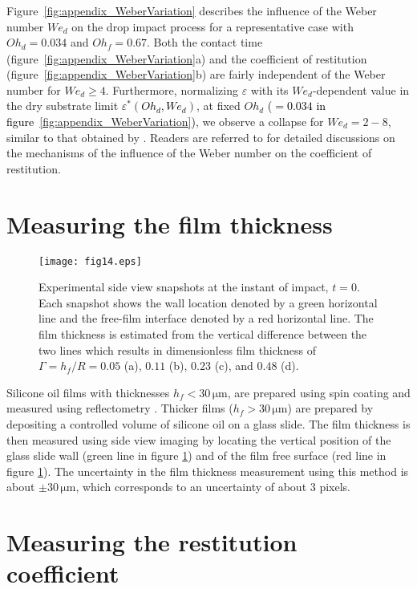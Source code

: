 \documentclass[]{jfm}
\newcommand{\revRev}[1]{\textcolor{black}{#1}}
\newcommand{\Ohd}{\mathit{Oh}_\mathit{d}}
\newcommand{\Ohf}{\mathit{Oh}_\mathit{f}}
\newcommand{\Wen}{\mathit{We}_\mathit{d}}
\begin{document}
Figure~\ref{fig:appendix_WeberVariation} describes the influence of the Weber number $\Wen$ on the drop impact process for a representative case with $\Ohd = 0.034$ and $\Ohf = 0.67$.
Both the contact time (figure~\ref{fig:appendix_WeberVariation}a) and the coefficient of restitution (figure~\ref{fig:appendix_WeberVariation}b) are fairly independent of the Weber number for $\Wen \ge 4$. 
Furthermore, normalizing $\varepsilon$ with its $\Wen$-dependent value in the dry substrate limit \revRev{$\varepsilon^*(\Ohd, \Wen)$}, at fixed $\Ohd$ \revRev{($= 0.034$ in figure~\ref{fig:appendix_WeberVariation})}, we observe a collapse for $\Wen = 2 - 8$, similar to that obtained by \citet{jha2020viscous}. 
Readers are referred to \citet{vatsalInProgress} for detailed discussions on the mechanisms of the influence of the Weber number on the coefficient of restitution. 

\section{Measuring the film thickness}
\label{sec:measuring_film_thickness}
\begin{figure}
	\centering
	\texttt{[image: fig14.eps]}
	\caption{Experimental side view snapshots at the instant of impact, $t = 0$. Each snapshot shows the wall location denoted by a green horizontal line and the free-film interface denoted by a red horizontal line. 
		The film thickness is estimated from the vertical difference between the two lines which results in dimensionless film thickness of $\Gamma = h_{f}/R =0.05$ (a), $0.11$ (b), $0.23$ (c), and $0.48$ (d).}
	\label{fig:figureA2a}
\end{figure}


Silicone oil films with thicknesses $h_f < 30\,\si{\micro\meter}$, are prepared using spin coating and measured using reflectometry \citep{reizman1965optical}. 
Thicker films ($h_f > 30\,\si{\micro\meter}$) are prepared by depositing a controlled volume of silicone oil on a glass slide. 
The film thickness is then measured using side view imaging by locating the vertical position of the glass slide wall (green line in figure \ref{fig:figureA2a}) and of the film free surface (red line in figure \ref{fig:figureA2a}).
The uncertainty in the film thickness measurement using this method is about $\pm 30\,\si{\micro\meter}$, which corresponds to an uncertainty of about 3 pixels. 


\section{Measuring the restitution coefficient}
\label{sec:restitution in simulations}
\end{document}
